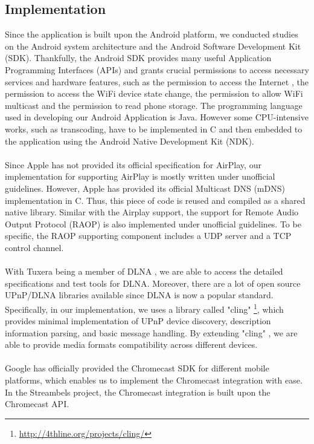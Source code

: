 \subsection{Implementation\label{3_2}}
Since the application is built upon the Android platform, we conducted studies on the Android system architecture and the Android Software Development Kit (SDK). Thankfully, the Android SDK provides many useful Application Programming Interfaces (APIs) and grants crucial permissions to access necessary services and hardware features, such as the permission to access the Internet , the permission to access the WiFi device state change, the permission to allow WiFi multicast and  the permission to read phone storage. The programming language used in developing our Android Application is Java. However some CPU-intensive works, such as transcoding, have to be implemented in C and then embedded to the application using the Android Native Development Kit (NDK).\\
\\
Since Apple has not provided its official specification for AirPlay, our implementation for supporting AirPlay is mostly written under unofficial guidelines. However, Apple has provided its official Multicast DNS (mDNS) implementation in C. Thus, this piece of code is reused and compiled as a shared native library. Similar with the Airplay support, the support for Remote Audio Output Protocol (RAOP) is
 also implemented under unofficial guidelines. To be specific, the RAOP supporting component includes a UDP server and a TCP control channel.\\
\\
With Tuxera being a member of DLNA , we are able to access the detailed specifications and test tools for DLNA. Moreover,  there are a lot of open source UPnP/DLNA
 libraries available since DLNA is now a popular standard. Specifically, in our
 implementation, we uses a library called "cling" \cite{cling}
 \footnote{\url{http://4thline.org/projects/cling/}}, which provides minimal
 implementation of UPnP device discovery, description information parsing, and basic message handling. By extending "cling" \cite{cling}, we are able to provide media formats compatibility across different devices.\\
\\
Google has officially provided the Chromecast SDK for different mobile platforms, which enables us to  implement the Chromecast integration with ease. In the Streambels project, the Chromecast integration is built upon the Chromecast API.\\

